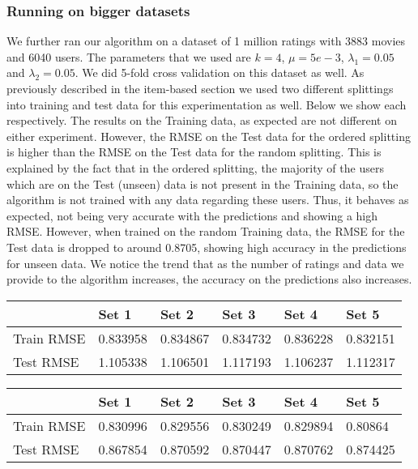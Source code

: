 \documentclass[a4paper]{article}
\begin{document}
\subsubsection*{Running on bigger datasets}
We further ran our algorithm on a dataset of 1 million ratings with 3883 movies and 6040 users. The parameters that we used are $k = 4 $, $\mu = 5e-3$, $\lambda_1 = 0.05$ and $\lambda_2 = 0.05$. We did 5-fold cross validation on this dataset as well. As previously described in the item-based section we used two different splittings into training and test data for this experimentation as well. Below we show each respectively. The results on the Training data, as expected are not different on either experiment. However, the RMSE on the Test data for the ordered splitting is higher than the RMSE on the Test data for the random splitting. This is explained by the fact that in the ordered splitting, the majority of the users which are on the Test (unseen) data is not present in the Training data, so the algorithm is not trained with any data regarding these users. Thus, it behaves as expected, not being very accurate with the predictions and showing a high RMSE. However, when trained on the random Training data, the RMSE for the Test data is dropped to around 0.8705, showing high accuracy in the predictions for unseen data. We notice the trend that as the number of ratings and data we provide to the algorithm increases, the accuracy on the predictions also increases.
\begin{center}
    \begin{tabular}{| l | l | l | l |l| l|}
    \hline
     & Set 1 & Set 2 & Set 3 & Set 4 & Set 5  \\ \hline
    Train RMSE & 0.833958 & 0.834867 & 0.834732 & 0.836228 & 0.832151 \\ \hline
    Test RMSE & 1.105338 & 1.106501 & 1.117193 & 1.106237 & 1.112317 \\ \hline
    \hline
    \end{tabular}
\end{center}

\begin{center}
    \begin{tabular}{| l | l | l | l |l| l|}
    \hline
     & Set 1 & Set 2 & Set 3 & Set 4 & Set 5  \\ \hline
    Train RMSE & 0.830996 & 0.829556 & 0.830249 & 0.829894 & 0.80864 \\ \hline
    Test RMSE & 0.867854 & 0.870592 & 0.870447 & 0.870762 & 0.874425 \\ \hline
    \hline
    \end{tabular}
\end{center}
\end{document}
